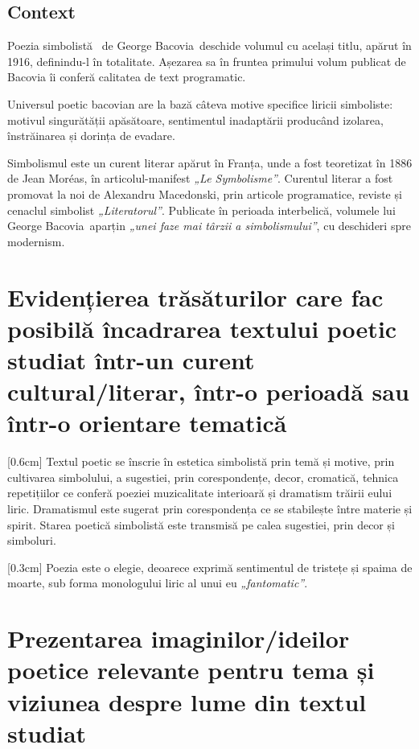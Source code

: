 \renewcommand{\operatitle}{\textbfit{„Plumb”}} %
\renewcommand{\operaauthor}{George Bacovia} %


\subsection{Context}

Poezia simbolistă \operatitle\ de \operaauthor\ deschide volumul cu același titlu, apărut în 1916, definindu-l în totalitate. Așezarea sa în fruntea primului volum publicat de Bacovia îi conferă calitatea de text programatic.

Universul poetic bacovian are la bază câteva motive specifice liricii simboliste: motivul singurătății apăsătoare, sentimentul inadaptării producând izolarea, înstrăinarea și dorința de evadare.

Simbolismul este un curent literar apărut în Franța, unde a fost teoretizat în 1886 de Jean Moréas, în articolul-manifest \textit{„Le Symbolisme”}. Curentul literar a fost promovat la noi de Alexandru Macedonski, prin articole programatice, reviste și cenaclul simbolist \textit{„Literatorul”}. Publicate în perioada interbelică, volumele lui \operaauthor\ aparțin \textit{„unei faze mai târzii a simbolismului”}, cu deschideri spre modernism.


\section{Evidențierea trăsăturilor care fac posibilă încadrarea textului poetic studiat într-un curent cultural/literar, într-o perioadă sau într-o orientare tematică}

[0.6cm]
Textul poetic se înscrie în estetica simbolistă prin temă și motive, prin cultivarea simbolului, a sugestiei, prin corespondențe, decor, cromatică, tehnica repetițiilor ce conferă poeziei muzicalitate interioară și dramatism trăirii eului liric. Dramatismul este sugerat prin corespondența ce se stabilește între materie și spirit. Starea poetică simbolistă este transmisă pe calea sugestiei, prin decor și simboluri.

[0.3cm]
Poezia este o elegie, deoarece exprimă sentimentul de tristețe și spaima de moarte, sub forma monologului liric al unui eu \textit{„fantomatic”}.


\section{Prezentarea imaginilor/ideilor poetice relevante pentru te\-ma și viziunea despre lume din textul studiat}

